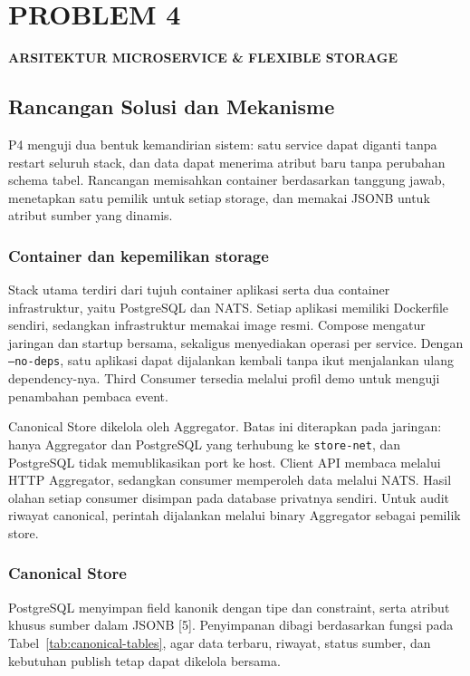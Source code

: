\chapter{PROBLEM 4}
\begin{center}\large\bfseries ARSITEKTUR MICROSERVICE \& FLEXIBLE STORAGE\end{center}

\section{Rancangan Solusi dan Mekanisme}
P4 menguji dua bentuk kemandirian sistem: satu service dapat diganti tanpa restart seluruh stack, dan data dapat menerima atribut baru tanpa perubahan schema tabel. Rancangan memisahkan container berdasarkan tanggung jawab, menetapkan satu pemilik untuk setiap storage, dan memakai JSONB untuk atribut sumber yang dinamis.

\subsection{Container dan kepemilikan storage}
Stack utama terdiri dari tujuh container aplikasi serta dua container infrastruktur, yaitu PostgreSQL dan NATS. Setiap aplikasi memiliki Dockerfile sendiri, sedangkan infrastruktur memakai image resmi. Compose mengatur jaringan dan startup bersama, sekaligus menyediakan operasi per service. Dengan \texttt{--no-deps}, satu aplikasi dapat dijalankan kembali tanpa ikut menjalankan ulang dependency-nya. Third Consumer tersedia melalui profil demo untuk menguji penambahan pembaca event.

Canonical Store dikelola oleh Aggregator. Batas ini diterapkan pada jaringan: hanya Aggregator dan PostgreSQL yang terhubung ke \texttt{store-net}, dan PostgreSQL tidak memublikasikan port ke host. Client API membaca melalui HTTP Aggregator, sedangkan consumer memperoleh data melalui NATS. Hasil olahan setiap consumer disimpan pada database privatnya sendiri. Untuk audit riwayat canonical, perintah dijalankan melalui binary Aggregator sebagai pemilik store.

\subsection{Canonical Store}
PostgreSQL menyimpan field kanonik dengan tipe dan constraint, serta atribut khusus sumber dalam JSONB [5]. Penyimpanan dibagi berdasarkan fungsi pada Tabel~\ref{tab:canonical-tables}, agar data terbaru, riwayat, status sumber, dan kebutuhan publish tetap dapat dikelola bersama.

